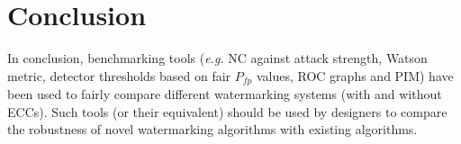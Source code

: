 \documentclass[10pt,twocolumn]{article}
\begin{document}
\section{Conclusion}
In conclusion, benchmarking tools (\emph{e.g.} NC against attack strength, 
Watson metric, detector thresholds based on fair $P_{\mathit fp}$ values,
ROC graphs and PIM)
have been used to fairly compare different watermarking systems (with and without ECCs). 
Such tools (or their equivalent) should be used by designers to compare the robustness of novel watermarking algorithms 
with existing algorithms. 

\end{document}
